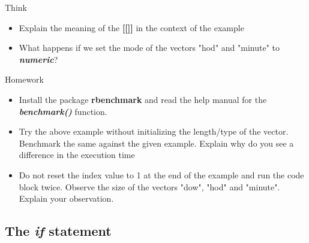 \begin{DIY}{Think}
\begin{itemize}
  \item \noindent Explain the meaning of the \textbf{[[]]} in the context of the example
  \item \noindent What happens if we set the mode of the vectors "hod" and "minute" to \textbf{\emph{numeric}}?
\end{itemize}
\end{DIY}

\begin{DIY}{Homework}
 \begin{itemize}
  \item \noindent Install the package \textbf{rbenchmark} and read the help manual for the \textbf{\emph{benchmark()}} function.
  \item \noindent Try the above example without initializing the length/type of the vector. Benchmark the same against the given example. Explain why do you see a difference in the execution time
  \item \noindent Do not reset the index value to 1 at the end of the example and run the code block twice. Observe the size of the vectors "dow", "hod" and "minute". Explain your observation.  
\end{itemize}
\end{DIY}

\subsection{The \textbf{\emph{if}} statement}
\begin{HIGHLIGHT}
\par{}
\end{HIGHLIGHT}

